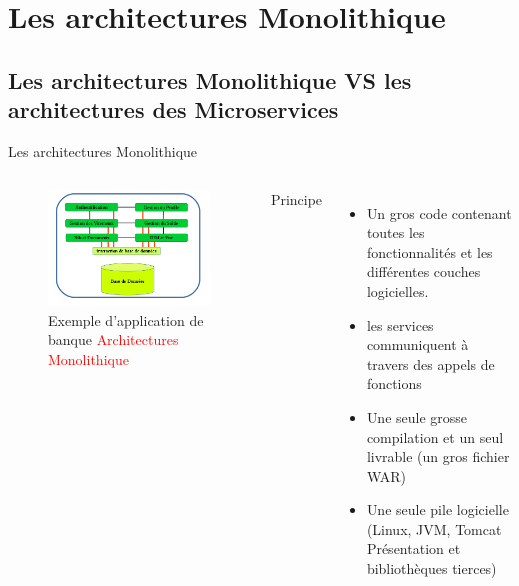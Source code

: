 \documentclass{beamer}
\begin{document}
\section{Les architectures Monolithique}
\subsection{Les architectures Monolithique VS les architectures des Microservices}
\begin{frame}{Les architectures Monolithique}
    \begin{columns}
        \begin{figure}
            \begin{center}
            \includegraphics[width=1\textwidth]{monopolitique.png}
                \caption{Exemple d'application de banque \textcolor{red}{Architectures Monolithique}}
            \end{center}
        \end{figure}
        Principe
        \begin{itemize}
            \item Un gros code contenant toutes les fonctionnalités et les
                différentes couches logicielles.
            \item les services communiquent à travers des appels de fonctions 
            \item Une seule grosse compilation et un seul livrable (un gros fichier WAR)
            \item Une seule pile logicielle (Linux, JVM, Tomcat Présentation et bibliothèques tierces)
        \end{itemize} 
    \end{columns}

\end{frame}
\end{document}
